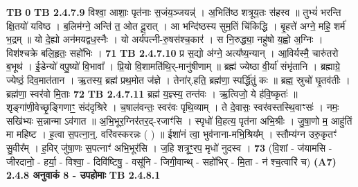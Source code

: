 \documentclass[17pt]{extarticle}
\begin{document}
                                \textbf{ TB } \newline
                   \textbf{ 0} \newline
                  \newline
                                \textbf{ TB 2.4.7.9} \newline
                  विश्वा॒ आशाः॒ पृत॑नाः स॒जंय॒ञ्जयन्न्॑ । अ॒भिति॑ष्ठ शत्रूय॒तः स॑हस्व ॥ तुभ्यं॑ भरन्ति क्षि॒तयो॑ यविष्ठ । ब॒लिम॑ग्ने॒ अन्ति॑ त॒ ओत दू॒रात् । आ भन्दि॑ष्ठस्य सुम॒तिं चि॑किद्धि । बृ॒हत्ते॑ अग्ने॒ महि॒ शर्म॑ भ॒द्रम् ॥ यो दे॒ह्यो अन॑मयद्वध॒स्नैः । यो अर्य॑पत्नी-रु॒षस॑श्च॒कार॑ । स नि॒रुद्ध्या॒ नहु॑षो य॒ह्वो अ॒ग्निः । विश॑श्चक्रे बलि॒हृतः॒ सहो॑भिः । \textbf{ 71} \newline
                  \newline
                                \textbf{ TB 2.4.7.10} \newline
                  प्र स॒द्यो अ॑ग्ने॒ अत्य᳚ष्य॒न्यान् । आ॒विर्यस्मै॒ चारु॑तरो ब॒भूथ॑ । ई॒डेन्यो॑ वपु॒ष्यो॑ वि॒भावा᳚ । प्रि॒यो वि॒शामति॑थि॒र्-मानु॑षीणाम् ॥ ब्रह्म॑ ज्येष्ठा वी॒र्या॑ संभृ॑तानि । ब्रह्माग्रे॒ ज्येष्ठं॒ दिव॒मात॑तान । ऋ॒तस्य॒ ब्रह्म॑ प्रथ॒मोत ज॑ज्ञे । तेना॑र्.हति॒ ब्रह्म॑णा॒ स्पर्द्धि॑तुं॒ कः ॥ ब्रह्म॒ स्रुचो॑ घृ॒तव॑तीः । ब्रह्म॑णा॒ स्वर॑वो मि॒ताः \textbf{ 72} \newline
                  \newline
                                \textbf{ TB 2.4.7.11} \newline
                  ब्रह्म॑ य॒ज्ञ्स्य॒ तन्त॑वः । ऋ॒त्विजो॒ ये ह॑वि॒ष्कृतः॑ ॥ शृङ्गा॑णी॒वेच्छृ॒ङ्गिणाꣳ॒॒ संद॑दृश्रिरे । च॒षाल॑वन्तः॒ स्वर॑वः पृथि॒व्याम् । ते दे॒वासः॒ स्वर॑वस्तस्थि॒वाꣳसः॑ । नमः॒ सखि॑भ्यः स॒न्नान्मा ऽव॑गात ॥ अ॒भि॒भूर॒ग्निर॑तर॒द्-रजाꣳ॑सि । स्पृधो॑ वि॒हत्य॒ पृत॑ना अभि॒श्रीः । जु॒षा॒णो म॒ आहु॑तिं मा महिष्ट । ह॒त्वा स॒पत्ना॒न्॒. वरि॑वस्करन्नः ( ) ॥ ईशा॑नं त्वा॒ भुव॑नाना-मभि॒श्रिय᳚म् । स्तौम्य॑ग्न उरु॒कृतꣳ॑ सु॒वीर᳚म् । ह॒विर् जु॑षा॒णः स॒पत्नाꣳ॑ अभि॒भूर॑सि । ज॒हि शत्रूꣳ॒॒रप॒ मृधो॑ नुदस्व । \textbf{ 73} \newline
                  \newline
                                    (वि॒शां - ज॑यामसि - जीरदानो॒ - हर्या॒ - विश्वा॒ - दिवि॑ष्टिषु॒ - वसू॑नि - जिगी॒वान्थ् - सहो॑भिर् - मि॒ता - न॑ श्च॒त्वारि॑ च) \textbf{(A7)} \newline \newline
                \textbf{ 2.4.8      अनुवाकं   8 - उपहोमाः} \newline
                                \textbf{ TB 2.4.8.1} \newline
\end{document}
